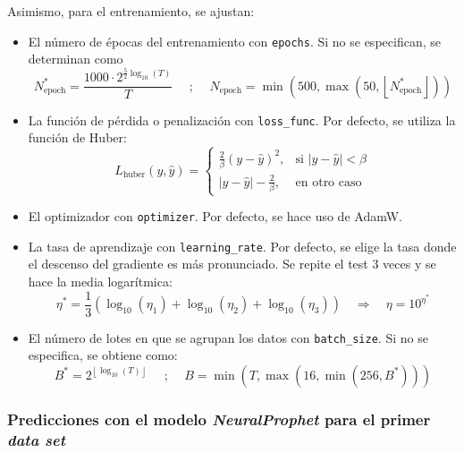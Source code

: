 \documentclass[12pt,twoside]{article}
\begin{document}
Asimismo, para el entrenamiento, se ajustan:

\begin{itemize}
    \item El número de épocas del entrenamiento con \texttt{epochs}. Si no se especifican, se determinan como 
    \begin{equation}
    N_{\text{epoch}}^* = \frac{1000 \cdot 2^{\frac{5}{2} \log_{10}(T)}}{T}
    \quad \text{ ; } \quad
    N_{\text{epoch}} = \min\left( 500, \max\left( 50, \left\lfloor N_{\text{epoch}}^* \right\rfloor \right) \right)
    \end{equation}
    \item La función de pérdida o penalización con \texttt{loss\_func}. Por defecto, se utiliza la función de Huber: 
    \begin{equation}
    L_{\text{huber}}(y, \hat{y}) =
    \begin{cases}
    \frac{2}{\beta} (y - \hat{y})^2, & \text{si } |y - \hat{y}| < \beta \\
    |y - \hat{y}| - \frac{2}{\beta}, & \text{en otro caso}
    \end{cases}
    \end{equation}
    \item El optimizador con \texttt{optimizer}. Por defecto, se hace uso de AdamW.
    \item La tasa de aprendizaje con \texttt{learning\_rate}. Por defecto, se elige la tasa donde el descenso del gradiente es más pronunciado. Se repite el test 3 veces y se hace la media logarítmica: 
    \begin{equation}
    \eta^* = \frac{1}{3} \left( \log_{10}(\eta_1) + \log_{10}(\eta_2) + \log_{10}(\eta_3) \right) \quad \Rightarrow \quad \eta = 10^{\eta^*}
    \end{equation}
    \item El número de lotes en que se agrupan los datos con \texttt{batch\_size}. Si no se especifica, se obtiene como: 
    \begin{equation}
    B^* = 2^{\left\lfloor \log_{10}(T) \right\rfloor}
    \quad \text{ ; } \quad
    B = \min\left( T, \max\left( 16, \min\left( 256, B^* \right) \right) \right)
    \end{equation}
\end{itemize}


\subsubsection{Predicciones con el modelo \textit{NeuralProphet} para el primer \textit{data set}}\label{sec:32}
\end{document}
